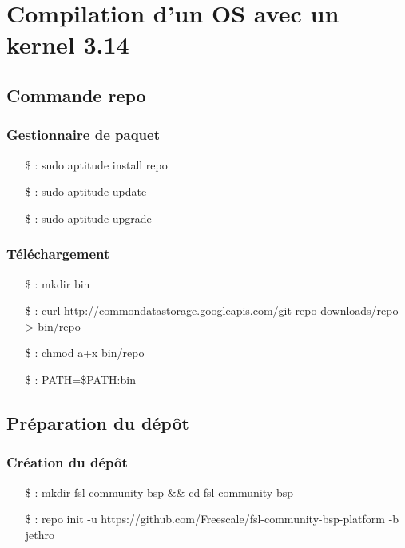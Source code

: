 
\chapter{Compilation d'un OS avec un kernel 3.14} %

\label{Chapter4} %

\section{Commande repo}

\subsection{Gestionnaire de paquet}

\begin{itemize}
    \item[\$ :] sudo aptitude install repo
    \item[\$ :] sudo aptitude update
    \item[\$ :] sudo aptitude upgrade
\end{itemize}

\subsection{Téléchargement}

\begin{itemize}
    \item[\$ :] mkdir bin
    \item[\$ :] curl http://commondatastorage.googleapis.com/git-repo-downloads/repo > bin/repo
    \item[\$ :] chmod a+x bin/repo
    \item[\$ :] PATH=\${PATH}:bin
\end{itemize}
        
\section{Préparation du dépôt}

\subsection{Création du dépôt}

\begin{itemize}
    \item[\$ :] mkdir fsl-community-bsp \&\& cd fsl-community-bsp
    \item[\$ :] repo init -u https://github.com/Freescale/fsl-community-bsp-platform -b jethro
\end{itemize}

